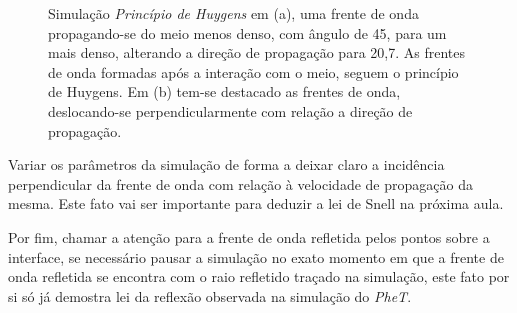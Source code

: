     
    \vspace*{10pt}
    \begin{figure}[!ht]        
        \centering              
        \hfill
        \caption{Simulação \emph{Princípio de Huygens} em (a), uma frente de onda propagando-se do meio menos denso, com ângulo de 45\degree, para um mais denso, alterando a direção de propagação para 20,7\degree. As frentes de onda formadas após a interação com o meio, seguem o princípio de Huygens. Em (b) tem-se destacado as frentes de onda, deslocando-se perpendicularmente com relação a direção de propagação.}
        \label{fig:huygens-refracao-reflexao}
    \end{figure}
    \vspace*{10pt}

    Variar os parâmetros da simulação de forma a deixar claro a incidência perpendicular da frente de onda com relação à velocidade de propagação da mesma. Este fato vai ser importante para deduzir a lei de Snell na próxima aula.

    Por fim, chamar a atenção para a frente de onda refletida pelos pontos sobre a interface, se necessário pausar a simulação no exato momento em que a frente de onda refletida se encontra com o raio refletido traçado na simulação, este fato por si só já demostra lei da reflexão observada na simulação do \emph{PheT}.
    

